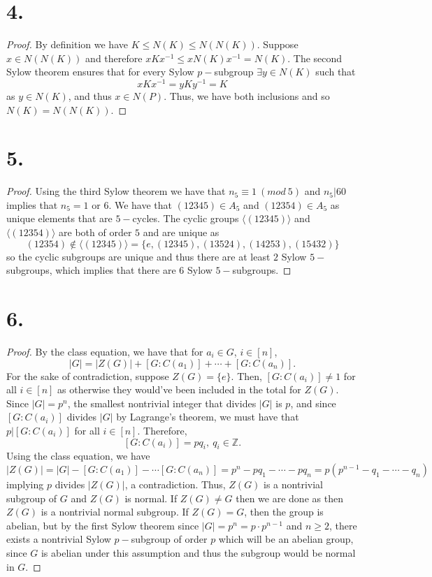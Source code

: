 \documentclass{article}
\begin{document}
\section*{4.}
\begin{proof}
    By definition we have $K \leq N(K) \leq N(N(K))$. Suppose $x \in N(N(K))$ and therefore $xKx^{-1} \leq xN(K)x^{-1} = N(K)$. The second Sylow theorem ensures that for every Sylow $p-$subgroup $\exists y \in N(K) $ such that 
    \[
    xKx^{-1} = yKy^{-1} = K    
    \]
    as $y \in N(K)$, and thus $x \in N(P)$. Thus, we have both inclusions and so $N(K) = N(N(K))$. 
\end{proof}

\section*{5.}
\begin{proof}
    Using the third Sylow theorem we have that $n_5 \equiv 1 \ (mod \ 5)$ and $n_5|60$ implies that $n_5 = 1 \text{ or }6$. We have that $(12345) \in A_5$ and $(12354) \in A_5$ as unique elements that are $5-$cycles. The cyclic groups $\langle (12345) \rangle$ and $\langle (12354) \rangle$ are both of order $5$ and are unique as 
    \[
    (12354) \notin \langle (12345) \rangle = \{e, (12345), (13524), (14253), (15432)\}    
    \]
    so the cyclic subgroups are unique and thus there are at least $2$ Sylow $5-$subgroups, which implies that there are $6$ Sylow $5-$subgroups. 
\end{proof}

\section*{6.}
\begin{proof}
    By the class equation, we have that for $a_i \in G$, $i \in [n]$, 
    \[
    |G| = |Z(G)| + [G : C(a_1)] + \cdots + [G: C(a_n)].   
    \]
    For the sake of contradiction, suppose $Z(G) = \{e \}$. Then, $[G : C(a_i)] \neq 1$ for all $i \in [n]$ as otherwise they would've been included in the total for $Z(G)$. Since $|G| = p^n$, the smallest nontrivial integer that divides $|G|$ is $p$, and since $[G : C(a_i)]$ divides $|G|$ by Lagrange's theorem, we must have that $p|[G : C(a_i)]$ for all $i \in [n]$. Therefore, 
    \[
    [G : C(a_i)] = pq_i, \ q_i \in \mathbb{Z}.    
    \]
    Using the class equation, we have 
    \[
    |Z(G)| = |G| - [G : C(a_1)] - \cdots [G: C(a_n)] = p^n - pq_1 - \cdots - pq_n = p(p^{n - 1} - q_1 - \cdots - q_n)    
    \]
    implying $p$ divides $|Z(G)|$, a contradiction. Thus, $Z(G)$ is a nontrivial subgroup of $G$ and $Z(G)$ is normal. If $Z(G) \neq G$ then we are done as then $Z(G)$ is a nontrivial normal subgroup. If $Z(G) = G$, then the group is abelian, but by the first Sylow theorem since $|G| = p^n = p \cdot p^{n - 1}$ and $n \geq 2$, there exists a nontrivial Sylow $p-$subgroup of order $p$ which will be an abelian group, since $G$ is abelian under this assumption and thus the subgroup would be normal in $G$. 
\end{proof}
\end{document}
